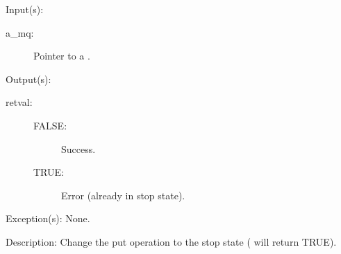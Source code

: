\begin{capi}
\begin{capilist}
	\item[Input(s): ]
		\begin{description}\item[]
		\item[a\_mq: ]
			Pointer to a .
		\end{description}
	\item[Output(s): ]
		\begin{description}\item[]
		\item[retval: ]
			\begin{description}\item[]
			\item[FALSE: ] Success.
			\item[TRUE: ] Error (already in stop state).
			\end{description}
		\end{description}
	\item[Exception(s): ] None.
	\item[Description: ]
		Change the put operation to the stop state
		( will return TRUE).
	\end{capilist}
\end{capi}
